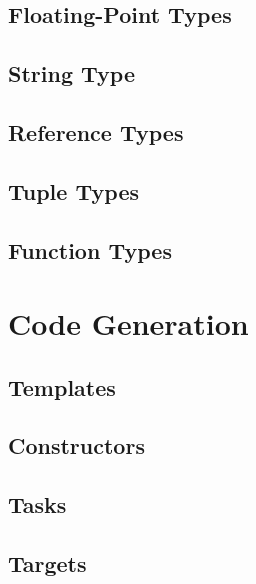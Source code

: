 \documentclass[a4paper,oneside,12pt, extrafontsizes]{memoir}
\begin{document}
  \chapter{Floating-Point Types}
  \label{ch:floating-point}
  

  \chapter{String Type}
  \label{ch:string}
  

  \chapter{Reference Types}
  \label{ch:concept-types}
  

  \chapter{Tuple Types}
  \label{ch:tuple-types}
  

  \chapter{Function Types}
  \label{ch:function-types}
  

\part{Code Generation}

  \chapter{Templates}
  \label{sec:templates}

  \chapter{Constructors}
  \label{sec:constructors}

  \chapter{Tasks}
  \label{sec:tasks}

  \chapter{Targets}
  \label{sec:targets}
\end{document}
